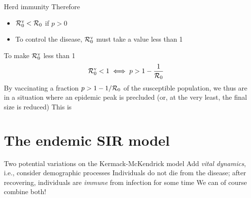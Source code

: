 \documentclass[aspectratio=43]{beamer}
\begin{document}
\begin{frame}{Herd immunity}
  Therefore
  \begin{itemize}
    \item $\mathcal{R}_0^{\textrm{v}}<\mathcal{R}_0$ if $p>0$ 
    \item To control the disease, $\mathcal{R}_0^{\text{v}}$ must take a value less than 1
  \end{itemize}
  \vfill
To make $\mathcal{R}_0^{\text{v}}$ less than 1
  \begin{equation}\label{eq:herd_immunity}
    \mathcal{R}_0^{\text{v}}<1 \iff p> 1-\frac{1}{\mathcal{R}_0}
  \end{equation}
  \vfill
  By vaccinating a fraction $p>1-1/\mathcal{R}_0$ of the susceptible population, we thus are in a situation where an epidemic peak is precluded (or, at the very least, the final size is reduced)
  \vfill
  This is 
\end{frame}







\section{The endemic SIR model}


\begin{frame}{Two potential variations on the Kermack-McKendrick model}
\bbullet Add \emph{vital dynamics}, i.e., consider demographic processes
\vfill
\bbullet Individuals do not die from the disease; after recovering, individuals are \emph{immune} from infection for some time
\vfill
\bbullet We can of course combine both!
\end{frame}
\end{document}
